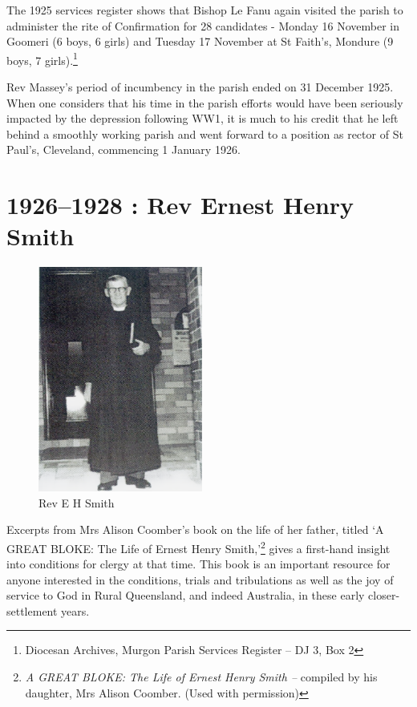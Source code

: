 The 1925 services register shows that Bishop Le Fanu again visited the
parish to administer the rite of Confirmation for 28 candidates - Monday
16 November in Goomeri (6 boys, 6 girls) and Tuesday 17 November at St
Faith's, Mondure (9 boys, 7 girls).\footnote{Diocesan Archives, Murgon
  Parish Services Register -- DJ 3, Box 2}

Rev Massey's period of incumbency in the parish ended on 31 December
1925. When one considers that his time in the parish efforts would have
been seriously impacted by the depression following WW1, it is much to
his credit that he left behind a smoothly working parish and went
forward to a position as rector of St Paul's, Cleveland, commencing 1
January 1926.

\printendnotes[custom]
\setcounter{endnote}{0}
\chapter{1926--1928 : Rev Ernest Henry
Smith}




\begin{figure}
\begin{center}
\includegraphics[width=0.48\textwidth,right]{images/EHSmith.png}
\caption{Rev E H Smith}
\end{center}
\end{figure}


Excerpts from Mrs Alison Coomber's book on the life of her father,
titled `A GREAT BLOKE: The Life of Ernest Henry Smith,'\footnote{\emph{A
  GREAT BLOKE: The Life of Ernest Henry Smith --} compiled by his
  daughter, Mrs Alison Coomber. (Used with permission)} gives a
first-hand insight into conditions for clergy at that time. This book is
an important resource for anyone interested in the conditions, trials
and tribulations as well as the joy of service to God in Rural
Queensland, and indeed Australia, in these early closer-settlement
years.

